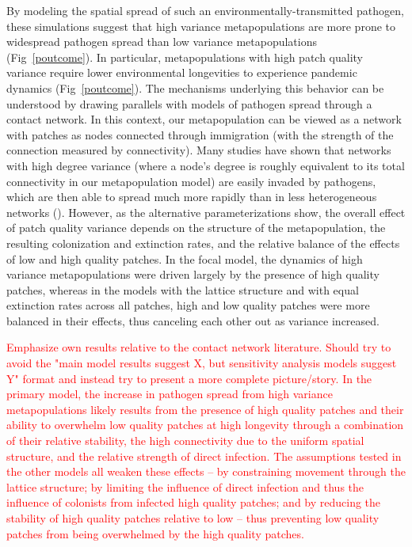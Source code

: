 \documentclass{svjour3}
\begin{document}
By modeling the spatial spread of such an environmentally-transmitted pathogen, these simulations suggest that high variance metapopulations are more prone to widespread pathogen spread than low variance metapopulations (Fig~\ref{poutcome}).  In particular, metapopulations with high patch quality variance require lower environmental longevities to experience pandemic dynamics (Fig~\ref{poutcome}).  The mechanisms underlying this behavior can be understood by drawing parallels with models of pathogen spread through a contact network.  In this context, our metapopulation can be viewed as a network with patches as nodes connected through immigration (with the strength of the connection measured by connectivity).  Many studies have shown that networks with high degree variance (where a node's degree is roughly equivalent to its total connectivity in our metapopulation model) are easily invaded by pathogens, which are then able to spread much more rapidly than in less heterogeneous networks (\cite{Pastor-Satorras2001}).  However, as the alternative parameterizations show, the overall effect of patch quality variance depends on the structure of the metapopulation, the resulting colonization and extinction rates, and the relative balance of the effects of low and high quality patches.  In the focal model, the dynamics of high variance metapopulations were driven largely by the presence of high quality patches, whereas in the models with the lattice structure and with equal extinction rates across all patches, high and low quality patches were more balanced in their effects, thus canceling each other out as variance increased.   

\textcolor{red}{Emphasize own results relative to the contact network literature.  Should try to avoid the "main model results suggest X, but sensitivity analysis models suggest Y" format and instead try to present a more complete picture/story.  In the primary model, the increase in pathogen spread from high variance metapopulations likely results from the presence of high quality patches and their ability to overwhelm low quality patches at high longevity through a combination of their relative stability, the high connectivity due to the uniform spatial structure, and the relative strength of direct infection.  The assumptions tested in the other models all weaken these effects -- by constraining movement through the lattice structure; by limiting the influence of direct infection and thus the influence of colonists from infected high quality patches; and by reducing the stability of high quality patches relative to low -- thus preventing low quality patches from being overwhelmed by the high quality patches.}
\end{document}
